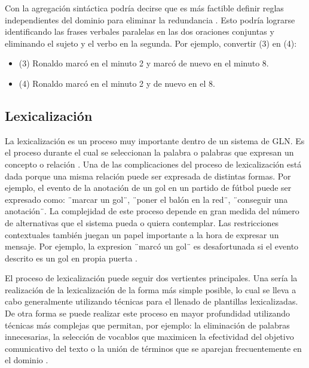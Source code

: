     Con la agregación sintáctica podría decirse que es más factible definir reglas independientes del dominio para eliminar la 
redundancia . Esto podría lograrse identificando las frases verbales paralelas en las dos oraciones conjuntas y eliminando el sujeto y el verbo en la segunda. 
Por ejemplo, convertir (3) en (4):

\begin{itemize}
    \item (3) Ronaldo marcó en el minuto 2 y marcó de nuevo en el minuto 8.
    \item (4) Ronaldo marcó en el minuto 2 y de nuevo en el 8.
\end{itemize}
    


\subsection{Lexicalización}\label{subsection:lexicalizacion}

    La lexicalización es un proceso muy importante dentro de un sistema de GLN. Es el proceso durante el cual se 
seleccionan la palabra o palabras que expresan un concepto o relaci\'on . Una de las 
complicaciones del proceso de lexicalización est\'a dada porque una misma relación puede ser expresada de 
distintas formas. Por ejemplo, el evento de la anotación de un gol en un partido de fútbol puede ser expresado como:
¨marcar un gol¨, ¨poner el balón en la red¨, ¨conseguir una anotación¨. La complejidad de este proceso depende en gran 
medida del número de alternativas que el sistema pueda o quiera contemplar. Las restricciones contextuales también juegan 
un papel importante a la hora de expresar un mensaje. Por ejemplo, la expresion ¨marcó un gol¨ es desafortunada si el evento 
descrito es un gol en propia puerta .

    El proceso de lexicalización puede seguir dos vertientes principales. Una ser\'ia la realizaci\'on de la  
lexicalización de la forma m\'as simple posible, lo cual se lleva a cabo generalmente utilizando t\'ecnicas para el llenado de 
plantillas lexicalizadas. De otra forma se puede realizar este proceso en mayor profundidad utilizando t\'ecnicas m\'as complejas  
que permitan, por ejemplo: la eliminaci\'on de palabras innecesarias, la selección de vocablos que maximicen la efectividad del objetivo 
comunicativo del texto o la uni\'on de t\'erminos que se aparejan frecuentemente en el dominio .


